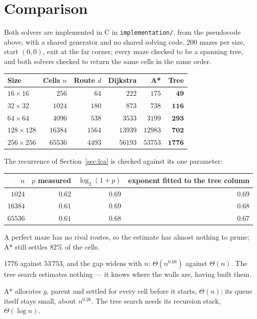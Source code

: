 \section{Comparison}
\label{sec:comparison}

Both solvers are implemented in C in \texttt{implementation/}, from the
pseudocode above, with a shared generator and no shared solving code. $200$
mazes per size, start $(0,0)$, exit at the far corner; every maze checked to be
a spanning tree, and both solvers checked to return the same cells in the same
order.

\begin{center}
\begin{tabular}{@{}lrrrrr@{}}
  \toprule
  Size & Cells $n$ & Route $d$ & Dijkstra & A* & Tree \\
  \midrule
  $16\times16$   & $256$   & $64$   & $222$   & $175$   & $\mathbf{49}$ \\
  $32\times32$   & $1024$  & $180$  & $873$   & $738$   & $\mathbf{116}$ \\
  $64\times64$   & $4096$  & $538$  & $3533$  & $3199$  & $\mathbf{293}$ \\
  $128\times128$ & $16384$ & $1564$ & $13939$ & $12983$ & $\mathbf{702}$ \\
  $256\times256$ & $65536$ & $4493$ & $56193$ & $53753$ & $\mathbf{1776}$ \\
  \bottomrule
\end{tabular}
\end{center}



The recurrence of Section~\ref{sec:lca} is checked against its one parameter:

\begin{center}
\begin{tabular}{@{}rrrr@{}}
  \toprule
  $n$ & $p$ measured & $\log_2(1+p)$ & exponent fitted to the tree column \\
  \midrule
  $1024$  & $0.62$ & $0.69$ & $0.69$ \\
  $16384$ & $0.61$ & $0.69$ & $0.68$ \\
  $65536$ & $0.61$ & $0.68$ & $0.67$ \\
  \bottomrule
\end{tabular}
\end{center}

\begin{description}[leftmargin=*,style=nextline,itemsep=5pt]
  \item[A* over Dijkstra: $4\%$.] A perfect maze has no rival routes, so the
    estimate has almost nothing to prune; A* still settles $82\%$ of the cells.
  \item[Tree over A*: a factor of $30$.] $1776$ against $53\,753$, and the gap
    widens with $n$: $\Theta(n^{0.68})$ against $\Theta(n)$. The tree search
    estimates nothing --- it knows where the walls are, having built them.
  \item[Memory.] A* allocates $g$, parent and settled for every cell before it
    starts, $\Theta(n)$; its queue itself stays small, about $n^{0.26}$. The
    tree search needs its recursion stack, $\Theta(\log n)$.
\end{description}
